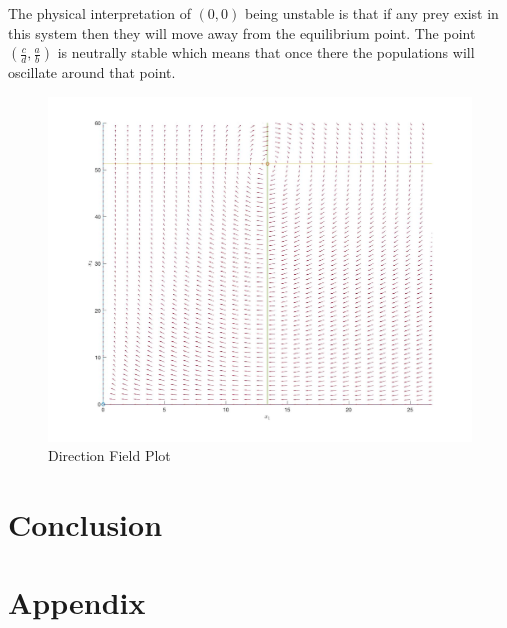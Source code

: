 \documentclass[12pt]{article}   %
\theoremstyle{definition}
\numberwithin{equation}{section}
\begin{document}
The physical interpretation of $(0,0)$ being unstable is that if any prey exist in this system then they will move away from the equilibrium point. The point $(\frac{c}{d},\frac{a}{b})$ is neutrally stable which means that once there the populations will oscillate around that point. 

\begin{figure}
	\includegraphics[width=\lindwidth]{DirField.jpg}
	\caption{Direction Field Plot}
	\label{fig:dirfield}
\end{figure}

\newpage
\setcounter{page}{6}
\section{Conclusion} \label{APPM2360proj01sec01}




\newpage
\setcounter{page}{7}
\section{Appendix} \label{APPM2360proj01sec01}
\end{document}
